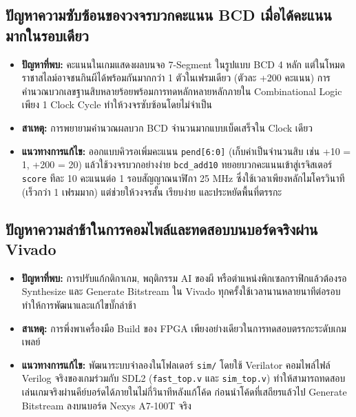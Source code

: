 \subsection{ปัญหาความซับซ้อนของวงจรบวกคะแนน BCD เมื่อได้คะแนนมากในรอบเดียว}
\begin{itemize}[leftmargin=1.5cm]
    \item \textbf{ปัญหาที่พบ:} คะแนนในเกมแสดงผลบนจอ 7-Segment ในรูปแบบ BCD 4 หลัก แต่ในโหมดราชาสไลม์อาจชนกินผีได้พร้อมกันมากกว่า 1 ตัวในเฟรมเดียว (ตัวละ +200 คะแนน) การคำนวณบวกเลขฐานสิบหลายร้อยพร้อมการทดหลักหลายหลักภายใน Combinational Logic เพียง 1 Clock Cycle ทำให้วงจรซับซ้อนโดยไม่จำเป็น
    \item \textbf{สาเหตุ:} การพยายามคำนวณผลบวก BCD จำนวนมากแบบเบ็ดเสร็จใน Clock เดียว
    \item \textbf{แนวทางการแก้ไข:} ออกแบบคิวรอเพิ่มคะแนน \texttt{pend[6:0]} (เก็บค่าเป็นจำนวนสิบ เช่น +10 = 1, +200 = 20) แล้วใช้วงจรบวกอย่างง่าย \texttt{bcd\_add10} ทยอยบวกคะแนนเข้าสู่เรจิสเตอร์ \texttt{score} ทีละ 10 คะแนนต่อ 1 รอบสัญญาณนาฬิกา 25 MHz ซึ่งใช้เวลาเพียงหลักไมโครวินาที (เร็วกว่า 1 เฟรมมาก) แต่ช่วยให้วงจรสั้น เรียบง่าย และประหยัดพื้นที่ตรรกะ
\end{itemize}

\subsection{ปัญหาความล่าช้าในการคอมไพล์และทดสอบบนบอร์ดจริงผ่าน Vivado}
\begin{itemize}[leftmargin=1.5cm]
    \item \textbf{ปัญหาที่พบ:} การปรับแก้กติกาเกม, พฤติกรรม AI ของผี หรือตำแหน่งพิกเซลกราฟิกแล้วต้องรอ Synthesize และ Generate Bitstream ใน Vivado ทุกครั้งใช้เวลานานหลายนาทีต่อรอบ ทำให้การพัฒนาและแก้ไขบั๊กล่าช้า
    \item \textbf{สาเหตุ:} การพึ่งพาเครื่องมือ Build ของ FPGA เพียงอย่างเดียวในการทดสอบตรรกะระดับเกมเพลย์
    \item \textbf{แนวทางการแก้ไข:} พัฒนาระบบจำลองในโฟลเดอร์ \texttt{sim/} โดยใช้ Verilator คอมไพล์ไฟล์ Verilog จริงของเกมร่วมกับ SDL2 (\texttt{fast\_top.v} และ \texttt{sim\_top.v}) ทำให้สามารถทดสอบเล่นเกมจริงผ่านคีย์บอร์ดได้ภายในไม่กี่วินาทีหลังแก้โค้ด ก่อนนำโค้ดที่เสถียรแล้วไป Generate Bitstream ลงบนบอร์ด Nexys A7-100T จริง
\end{itemize}

